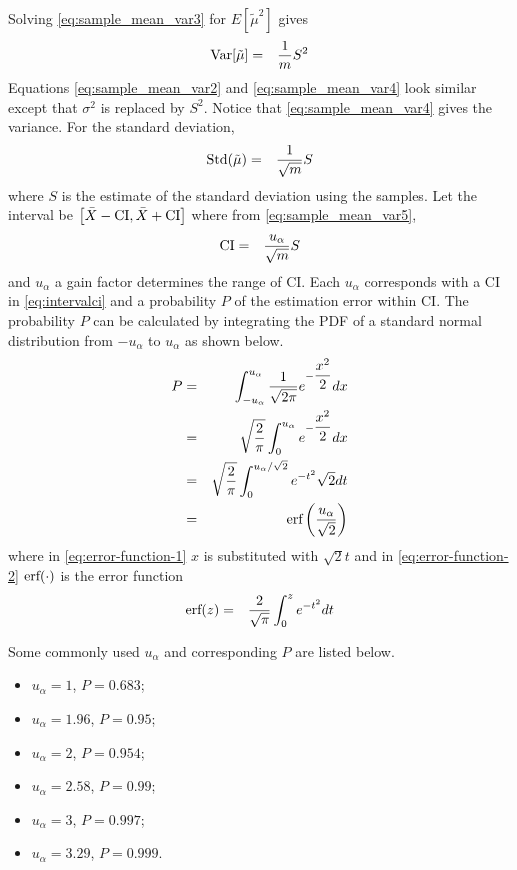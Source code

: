 Solving \eqref{eq:sample_mean_var3} for $E[\tilde{\mu}^2]$ gives
\begin{eqnarray}
	\textup{Var}[\tilde{\mu}] &=& \dfrac{1}{m}S^2 \label{eq:sample_mean_var4}
\end{eqnarray}
Equations \eqref{eq:sample_mean_var2} and \eqref{eq:sample_mean_var4} look similar except that $\sigma^2$ is replaced by $S^2$. Notice that \eqref{eq:sample_mean_var4} gives the variance. For the standard deviation,
\begin{eqnarray}
	\textup{Std}(\tilde{\mu}) &=& \dfrac{1}{\sqrt{m}}S \label{eq:sample_mean_var5}
\end{eqnarray} 
where $S$ is the estimate of the standard deviation using the samples. Let the interval be $\left[\bar{X}-\textup{CI}, \bar{X}+\textup{CI}\right]$ where from \eqref{eq:sample_mean_var5},
\begin{eqnarray}
	\textup{CI} &=& \dfrac{u_{\alpha}}{\sqrt{m}}S \label{eq:intervalci}
\end{eqnarray}
and $u_{\alpha}$ a gain factor determines the range of CI. Each $u_{\alpha}$ corresponds with a CI in \eqref{eq:intervalci} and a probability $P$ of the estimation error within CI. The probability $P$ can be calculated by integrating the PDF of a standard normal distribution from $-u_{\alpha}$ to $u_{\alpha}$ as shown below.
\begin{eqnarray}
	P &=& \int_{-u_{\alpha}}^{u_{\alpha}} \dfrac{1}{\sqrt{2\pi}}e^{-\dfrac{x^2}{2}}dx \nonumber \\
	&=& \sqrt{\dfrac{2}{\pi}}\int_{0}^{u_{\alpha}} e^{-\dfrac{x^2}{2}}dx \nonumber \\
	&=& \sqrt{\dfrac{2}{\pi}}\int_{0}^{u_{\alpha}/\sqrt{2}}e^{-t^2}\sqrt{2}dt \label{eq:error-function-1} \\
	&=& \textup{erf}\left(\dfrac{u_\alpha}{\sqrt{2}}\right) \label{eq:error-function-2}
\end{eqnarray}
where in \eqref{eq:error-function-1} $x$ is substituted with $\sqrt{2}t$ and in \eqref{eq:error-function-2} $\textup{erf}(\cdot)$ is the error function 
\begin{eqnarray}
	\textup{erf}(z) &=& \dfrac{2}{\sqrt{\pi}}\int_{0}^{z}e^{-t^2}dt \nonumber
\end{eqnarray}

Some commonly used $u_{\alpha}$ and corresponding $P$ are listed below.
\begin{itemize}
	\item $u_{\alpha}=1$, $P=0.683$;
	\item $u_{\alpha}=1.96$, $P=0.95$;
	\item $u_{\alpha}=2$, $P=0.954$;
	\item $u_{\alpha}=2.58$, $P=0.99$;
	\item $u_{\alpha}=3$, $P=0.997$;
	\item $u_{\alpha}=3.29$, $P=0.999$.
\end{itemize}

